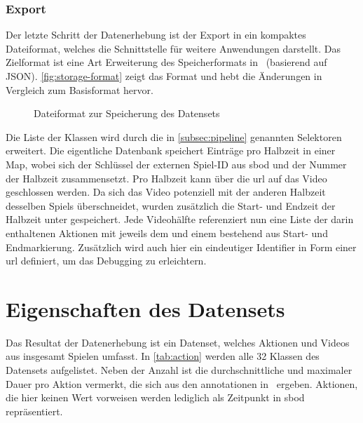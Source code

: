 \subsubsection{Export}

Der letzte Schritt der Datenerhebung ist der Export in ein kompaktes Dateiformat, welches die Schnittstelle für weitere Anwendungen darstellt.
Das Zielformat ist eine Art Erweiterung des Speicherformats in~\cite{Caba15} (basierend auf JSON).
\autoref{fig:storage-format} zeigt das Format und hebt die Änderungen in Vergleich zum Basisformat hervor.

\begin{figure}
    \centering
    \caption{Dateiformat zur Speicherung des Datensets}
    \label{fig:storage-format}
\end{figure}

Die Liste der Klassen wird durch die in \autoref{subsec:pipeline} genannten Selektoren erweitert.
Die eigentliche Datenbank speichert Einträge pro Halbzeit in einer Map, wobei sich der Schlüssel der externen Spiel-ID aus \gls{sbod} und der Nummer der Halbzeit zusammensetzt.
Pro Halbzeit kann über die \gls{url} auf das Video geschlossen werden.
Da sich das Video potenziell mit der anderen Halbzeit desselben Spiels überschneidet, wurden zusätzlich die Start- und Endzeit der Halbzeit unter  gespeichert.
Jede Videohälfte referenziert nun eine Liste der darin enthaltenen Aktionen mit jeweils dem  und einem  bestehend aus Start- und Endmarkierung.
Zusätzlich wird auch hier ein eindeutiger Identifier in Form einer \gls{url} definiert, um das Debugging zu erleichtern.

\section{Eigenschaften des Datensets}
\label{sec:eigenschaften-des-datensets}

Das Resultat der Datenerhebung ist ein Datenset, welches \noaction Aktionen und \novideos Videos aus insgesamt \nomatches Spielen umfasst.
In \autoref{tab:action} werden alle 32 Klassen des Datensets aufgelistet.
Neben der Anzahl ist die durchschnittliche und maximaler Dauer pro Aktion vermerkt, die sich aus den \gls{annotationen} in~\cite{Statsbomb20} ergeben.
Aktionen, die hier keinen Wert vorweisen werden lediglich als Zeitpunkt in \gls{sbod} repräsentiert.

